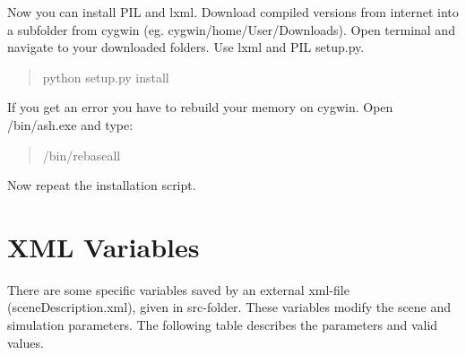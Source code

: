 \documentclass[10pt,a4paper]{report}
\begin{document}
Now you can install PIL and lxml. Download compiled versions from internet into a subfolder from cygwin (eg. cygwin/home/User/Downloads). Open terminal and navigate to your downloaded folders. Use lxml and PIL setup.py.

\begin{quote}
python setup.py install
\end{quote}

If you get an error you have to rebuild your memory on cygwin. Open /bin/ash.exe and type:

\begin{quote}
/bin/rebaseall
\end{quote}

Now repeat the installation script.

\chapter{XML Variables}
\label{chap:xml_variables}

There are some specific variables saved by an external xml-file (sceneDescription.xml), given in src-folder. These variables modify the scene and simulation parameters. The following table describes the parameters and valid values.
\end{document}

